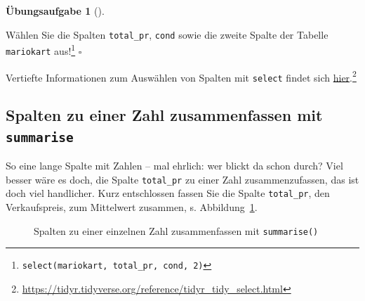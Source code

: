 \documentclass[
  a4paper,
]{scrbook}
\theoremstyle{definition}
\theoremstyle{definition}
\theoremstyle{definition}
\newtheorem{exercise}{Übungsaufgabe}[chapter]
\theoremstyle{remark}
\begin{document}
\begin{exercise}[]\protect\hypertarget{exr-select}{}\label{exr-select}

Wählen Sie die Spalten \texttt{total\_pr}, \texttt{cond} sowie die
zweite Spalte der Tabelle \texttt{mariokart} aus!\footnote{\texttt{select(mariokart,\ total\_pr,\ cond,\ 2)}}
\(\square\)

\end{exercise}

Vertiefte Informationen zum Auswählen von Spalten mit \texttt{select}
findet sich
\href{https://tidyr.tidyverse.org/reference/tidyr_tidy_select.html}{hier}.\footnote{\url{https://tidyr.tidyverse.org/reference/tidyr_tidy_select.html}}

\subsection{\texorpdfstring{Spalten zu einer Zahl zusammenfassen mit
\texttt{summarise}}{Spalten zu einer Zahl zusammenfassen mit summarise}}\label{spalten-zu-einer-zahl-zusammenfassen-mit-summarise}

So eine lange Spalte mit Zahlen -- mal ehrlich: wer blickt da schon
durch? Viel besser wäre es doch, die Spalte \texttt{total\_pr} zu einer
Zahl zusammenzufassen, das ist doch viel handlicher. Kurz entschlossen
fassen Sie die Spalte \texttt{total\_pr}, den Verkaufspreis, zum
Mittelwert zusammen, s. Abbildung~\ref{fig-summarise}.

\begin{figure}


\caption{\label{fig-summarise}Spalten zu einer einzelnen Zahl
zusammenfassen mit \texttt{summarise()}}

\end{figure}%
\end{document}
